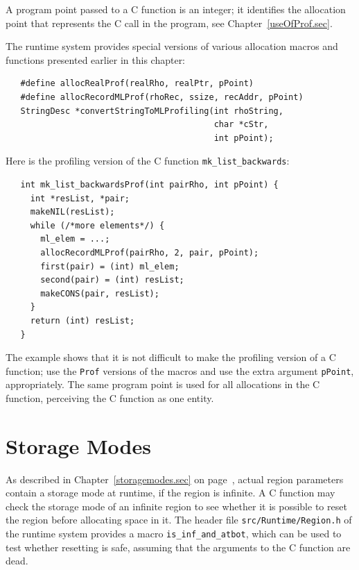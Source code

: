 \documentclass[12pt]{book}
\begin{document}
A program point passed to a C function is an integer; it identifies the
allocation point that represents the C call in the program, see
Chapter~\ref{useOfProf.sec}.

The runtime system provides special versions of various allocation
macros and functions presented earlier in this chapter:
%
%
%
\begin{verbatim}
   #define allocRealProf(realRho, realPtr, pPoint)
   #define allocRecordMLProf(rhoRec, ssize, recAddr, pPoint)
   StringDesc *convertStringToMLProfiling(int rhoString, 
                                          char *cStr, 
                                          int pPoint);
\end{verbatim}

Here is the profiling version of the C function
\verb|mk_list_backwards|:
\begin{verbatim}
   int mk_list_backwardsProf(int pairRho, int pPoint) {
     int *resList, *pair;
     makeNIL(resList);  
     while (/*more elements*/) {
       ml_elem = ...;
       allocRecordMLProf(pairRho, 2, pair, pPoint);
       first(pair) = (int) ml_elem;
       second(pair) = (int) resList;
       makeCONS(pair, resList);
     }
     return (int) resList;
   }
\end{verbatim}
The example shows that it is not difficult to make the profiling
version of a C function; use the \texttt{Prof} versions of the
macros and use the extra argument \texttt{pPoint}, appropriately. The
same program point is used for all allocations in the C function,
perceiving the C function as one entity.

\section{Storage Modes}
As described in Chapter~\ref{storagemodes.sec} on
page~\pageref{atbit.lab}, actual region parameters contain a storage
mode at runtime, if the region is infinite.  A C function may check
the storage mode of an infinite region to see whether it is possible
to reset the region before allocating space in it. The header file
{\tt src/Runtime/Region.h} of the runtime system provides a macro
%
\verb|is_inf_and_atbot|, which can be used to test whether resetting
is safe, assuming that the arguments to the C function are dead.
\end{document}
